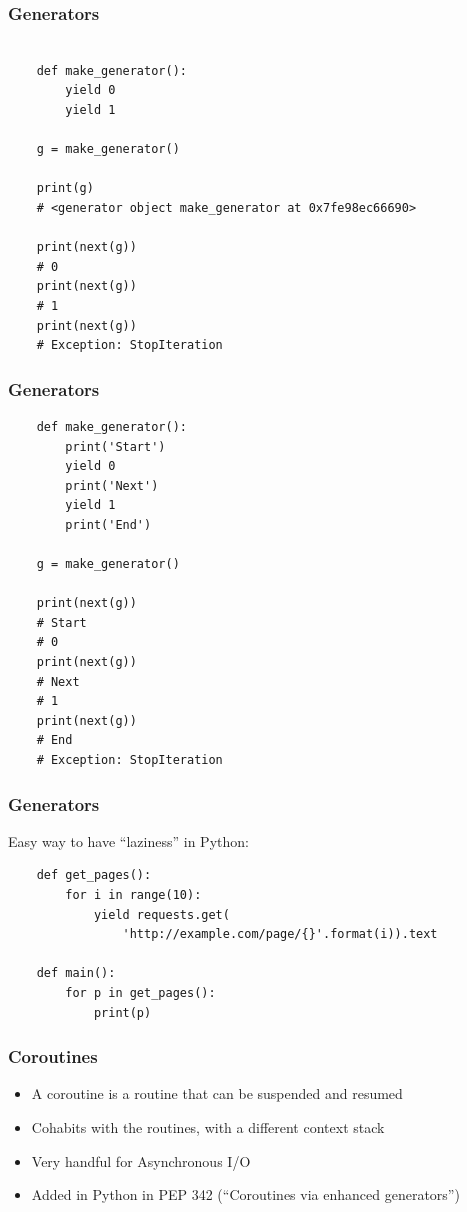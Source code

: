 \documentclass[ignorenonframetext,]{beamer}
\begin{document}
\begin{frame}[fragile]\frametitle{Generators}

\footnotesize{
\begin{verbatim}

    def make_generator():
        yield 0
        yield 1

    g = make_generator()

    print(g)
    # <generator object make_generator at 0x7fe98ec66690>

    print(next(g))
    # 0
    print(next(g))
    # 1
    print(next(g))
    # Exception: StopIteration

\end{verbatim}
}

\end{frame}

\begin{frame}[fragile]\frametitle{Generators}

\footnotesize{
\begin{verbatim}
    def make_generator():
        print('Start')
        yield 0
        print('Next')
        yield 1
        print('End')

    g = make_generator()

    print(next(g))
    # Start
    # 0
    print(next(g))
    # Next
    # 1
    print(next(g))
    # End
    # Exception: StopIteration
\end{verbatim}
}

\end{frame}

\begin{frame}[fragile]\frametitle{Generators}

Easy way to have ``laziness'' in Python:

\footnotesize{
\begin{verbatim}
    def get_pages():
        for i in range(10):
            yield requests.get(
                'http://example.com/page/{}'.format(i)).text

    def main():
        for p in get_pages():
            print(p)
\end{verbatim}
}

\end{frame}

\begin{frame}[fragile]\frametitle{Coroutines}

\begin{itemize}[<+->]
\itemsep1pt\parskip0pt
\item
  A coroutine is a routine that can be suspended and resumed
\item
  Cohabits with the routines, with a different context stack
\item
  Very handful for Asynchronous I/O
\item
  Added in Python in PEP 342 (``Coroutines via enhanced generators'')
\end{itemize}

\end{frame}
\end{document}

